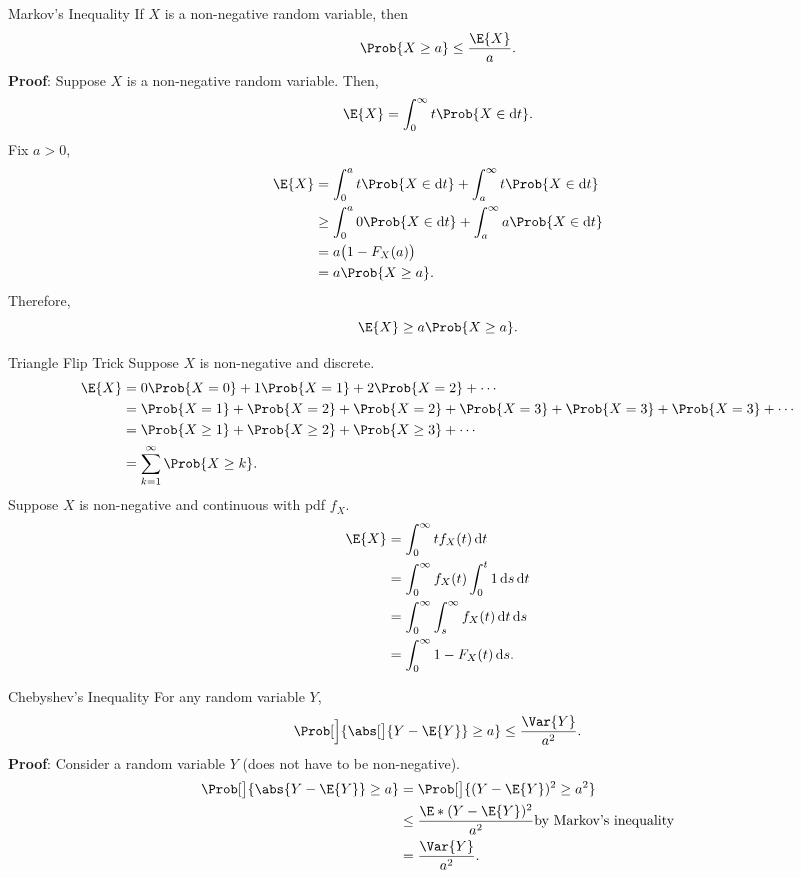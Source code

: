\begin{Theorem}{Markov's Inequality}{}
    If $ X $ is a non-negative random variable, then
    \[ \Prob{X\ge a}\le \frac{\E{X}}{a}. \]
    \tcblower{}
    \textbf{Proof}:
    Suppose $ X $ is a non-negative random variable. Then,
    \[ \E{X}=\int_{0}^{\infty}t\Prob{X\in \odif{t}}. \]
    Fix $ a>0 $,
    \begin{align*}
        \E{X}
         & =\int_{0}^{a}t\Prob{X\in\odif{t}}+\int_{a}^{\infty}t\Prob{X\in\odif{t}}     \\
         & \ge \int_{0}^{a}0\Prob{X\in \odif{t}}+\int_{a}^{\infty}a\Prob{X\in\odif{t}} \\
         & =a\bigl(1-F_X(a)\bigr)                                                      \\
         & =a\Prob{X\ge a}.
    \end{align*}
    Therefore,
    \[ \E{X}\ge a\Prob{X\ge a}. \]
\end{Theorem}
\begin{Remark}{Triangle Flip Trick}{}
    Suppose $ X $ is non-negative and discrete.
    \begin{align*}
        \E{X}
         & =0\Prob{X=0}+1\Prob{X=1}+2\Prob{X=2}+\cdots                               \\
         & =\Prob{X=1}+\Prob{X=2}+\Prob{X=2}+\Prob{X=3}+\Prob{X=3}+\Prob{X=3}+\cdots \\
         & =\Prob{X\ge 1}+\Prob{X\ge 2}+\Prob{X\ge 3}+\cdots                         \\
         & =\sum_{k=1}^{\infty}\Prob{X\ge k}.
    \end{align*}
    Suppose $ X $ is non-negative and continuous with pdf $ f_X $.
    \begin{align*}
        \E{X}
         & =\int_{0}^{\infty}t f_X(t)\odif{t}                        \\
         & =\int_{0}^{\infty}f_X(t)\int_{0}^{t}1\odif{s}\odif{t}     \\
         & =\int_{0}^{\infty}\int_{s}^{\infty}f_X(t)\odif{t}\odif{s} \\
         & =\int_{0}^{\infty}1-F_X(t)\odif{s}.
    \end{align*}
\end{Remark}
\begin{Theorem}{Chebyshev's Inequality}{}
    For any random variable $ Y $,
    \[ \Prob[\Big]{\abs[\big]{Y-\E{Y}}\ge a}\le\frac{\Var{Y}}{a^2}. \]
    \tcblower{}
    \textbf{Proof}:
    Consider a random variable $ Y $ (does not have to be non-negative).
    \begin{align*}
        \Prob[\big]{\abs{Y-\E{Y}}\ge a}
         & =\Prob[\big]{(Y-\E{Y})^2\ge a^2}                              \\
         & \le \frac{\E*{(Y-\E{Y})^2}}{a^2}\text{by Markov's inequality} \\
         & =\frac{\Var{Y}}{a^2}.
    \end{align*}
\end{Theorem}
